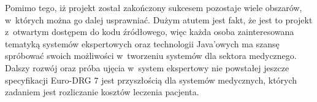 Pomimo tego, iż projekt został zakończony sukcesem pozostaje wiele obszarów, w~których można go dalej usprawniać. Dużym atutem jest fakt, że jest to projekt z~otwartym dostępem do kodu źródłowego, więc każda osoba zainteresowana tematyką systemów ekspertowych oraz technologii Java'owych ma szansę spróbować swoich możliwości w~tworzeniu systemów dla sektora medycznego. Dalszy rozwój oraz próba ujęcia w~system ekspertowy nie powstałej jeszcze specyfikacji Euro-DRG 7 jest przyszłością dla systemów medycznych, których zadaniem jest rozliczanie kosztów leczenia pacjenta.
